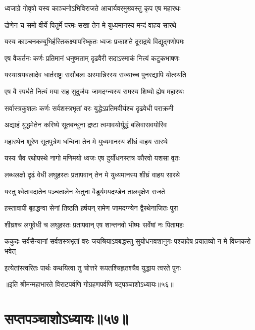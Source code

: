 \twolineshloka
{ध्वजाग्रे गोवृषो यस्य काञ्चनोऽभिविराजते}
{आचार्यवरमुख्यस्तु कृप एष महारथः}


\twolineshloka
{द्रोणेन च समो वीर्ये पितुर्मे परमः सखा}
{तेन मे युध्यमानस्य मन्दं वाहय सारथे}


\twolineshloka
{यस्य काञ्चनकम्बूभिर्हस्तिकक्ष्यापरिष्कृतः}
{ध्वजः प्रकाशते दूराद्रथे विद्युद्गणोपमः}


\twolineshloka
{एष वैकर्तनः कर्णः प्रतिमानं धनुष्मताम्}
{दृढवैरी सदाऽस्माकं नित्यं कटुकभाषणः}


\twolineshloka
{यस्याश्रयबलादेव धार्तराष्ट्रः ससौबलः}
{अस्मान्निरस्य राज्याच्च पुनरद्यापि योत्स्यति}


\twolineshloka
{एष वै स्पर्धते नित्यं मया सह सुदुर्जयः}
{जामदग्न्यस्य रामस्य शिष्यो ह्येष महारथः}


\twolineshloka
{सर्वास्त्रकुशलः कर्णः सर्वशस्त्रभृतां वरः}
{युद्धेऽप्रतिमवीर्यश्च दृढवेधी पराक्रमी}


\twolineshloka
{अद्याहं युद्धमेतेन करिष्ये सूतबन्धुना}
{द्रष्टा त्वमावयोर्युद्धं बलिवासवयोरिव}


\twolineshloka
{महारथेन शूरेण सूतपुत्रेण धन्विना}
{तेन मे युध्यमानस्य शीघ्रं वाहय सारथे}


\twolineshloka
{यस्य चैव रथोपस्थे नागो मणिमयो ध्वजः}
{एष दुर्योधनस्तत्र कौरवो यशसा वृतः}


\twolineshloka
{लब्धलक्षो दृढं वेधी लघुहस्तः प्रतापवान्}
{तेन मे युध्यमानस्य शीघ्रं वाहय सारथे}


\twolineshloka
{यस्तु श्वेतावदातेन पञ्चतालेन केतुना}
{वैडूर्यमयदण्डेन तालवृक्षेण राजते}


\twolineshloka
{हस्तावापी बृहद्धन्वा सेनां तिष्ठति हर्षयन्}
{रामेण जामदग्न्येन द्वैरथेनाजितः पुरा}


\twolineshloka
{शीघ्रश्च लगुवेधी च लघुहस्तः प्रतापवान्}
{एष शान्तनवो भीष्मः सर्वेषां नः पितामहः}


\threelineshloka
{ककुदः सर्वसैन्यानां सर्वशस्त्रभृतां वरः}
{जयश्रियाऽवबद्धस्तु सुयोधनवशानुगः}
{पश्चादेष प्रयातव्यो न मे विघ्नकरो भवेत्}


\twolineshloka
{इत्येतांस्त्वरितः पार्थः कथयित्वा तु चोत्तरे}
{रूपतश्चिह्नतश्चैव युद्धाय त्वरते पुनः}

॥इति श्रीमन्महाभारते विराटपर्वणि गोग्रहणपर्वणि षट्पञ्चाशोऽध्यायः॥५६॥

\chapter{सप्तपञ्चाशोऽध्यायः॥५७॥}

